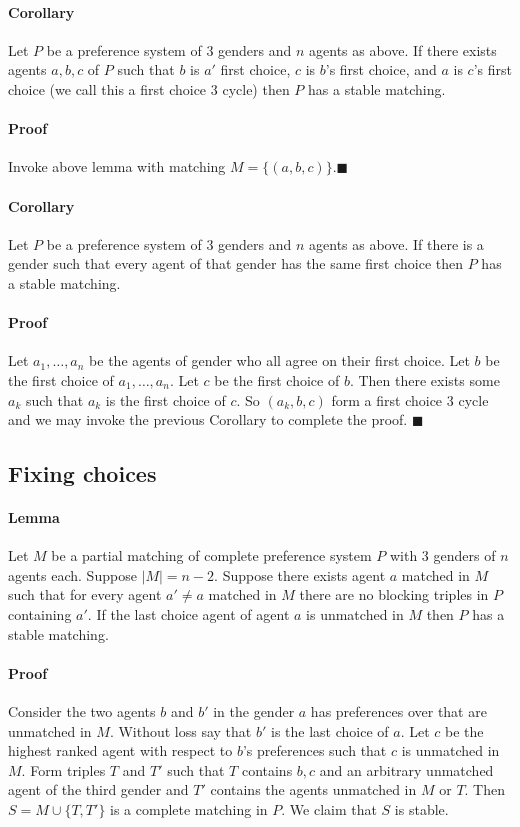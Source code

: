 \documentclass[letterpaper,12pt,oneside,onecolumn]{article}
\begin{document}
\paragraph{Corollary}
Let $P$ be a preference system of $3$ genders and $n$ agents as above. If there exists agents $a,b,c$ of $P$ such that $b$ is $a'$ first choice, $c$ is $b$'s first choice, and $a$ is $c$'s first choice (we call this a first choice $3$ cycle) then $P$ has a stable matching.
\paragraph{Proof}
Invoke above lemma with matching $M = \{ (a,b,c)\}$.$\blacksquare$
\paragraph{Corollary}
Let $P$ be a preference system of $3$ genders and $n$ agents as above. If there is a gender such that every agent of that gender has the same first choice then $P$ has a stable matching.
\paragraph{Proof}
Let $a_1, \dots, a_n$ be the agents of gender who all agree on their first choice. Let $b$ be the first choice of $a_1, \dots, a_n$. Let $c$ be the first choice of $b$. Then there exists some $a_k$ such that $a_k$ is the first choice of $c$. So $(a_k, b,c)$ form a first choice $3$ cycle and we may invoke the previous Corollary to complete the proof. $\blacksquare$
\subsection*{Fixing choices}
\paragraph{Lemma} Let $M$ be a partial matching of complete preference system $P$ with $3$ genders of $n$ agents each. Suppose $|M| = n-2$. Suppose there exists agent $a$ matched in $M$ such that for every agent $a'\neq a$ matched in $M$ there are no blocking triples in $P$ containing $a'$. If the last choice agent of agent $a$ is unmatched in $M$ then $P$ has a stable matching.
\paragraph{Proof}
Consider the two agents $b$ and $b'$ in the gender $a$ has preferences over that are unmatched in $M$. Without loss say that $b'$ is the last choice of $a$. Let $c$ be the highest ranked agent with respect to $b$'s preferences such that $c$ is unmatched in $M$. Form triples $T$ and $T'$ such that $T$ contains $b, c$ and an arbitrary unmatched agent of the third gender and $T'$ contains the agents unmatched in $M$ or $T$. Then $S = M \cup \{T,T'\}$ is a complete matching in $P$. We claim that $S$ is stable.
\end{document}
